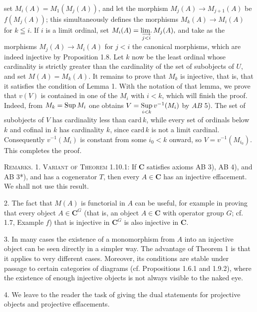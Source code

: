 
\noindent set $M_i(A)=M_1(M_j(A))$, and let the morphism
$M_j(A)\to M_{j+1}(A)$ be $f(M_j(A))$; this simultaneously
defines the morphisms $M_k(A)\to M_i(A)$ for $k\leqq i$. If $i$ is
a limit ordinal, set
$M_i(A)=\mathop{\rm lim.}\limits_{\substack{\longrightarrow\\j<i}}M_j(A),$ and take as the morphisms $M_j(A)\to M_i(A)$ for $j<i$
the canonical morphisms, which are indeed injective by Proposition 1.8. Let
$k$ now be the least ordinal whose cardinality is strictly greater than the
cardinality of the set of subobjects of $U$, and set $M(A)=M_k(A)$. It remains
to prove that $M_k$ is injective, that is, that it satisfies the condition of
Lemma 1. With the notation of that lemma, we prove that $v(V)$ is contained in
one of the $M_i$ with $i<k$, which will finish the proof. Indeed, from
$M_k=\mathop{\rm Sup}M_i$ one obtains
$V=\mathop{\rm Sup}\limits_{i<k}v^{-1}(M_i)$ by $AB$ 5). The set of subobjects of $V$ has cardinality less than
$\mathrm{card}\,k$, while every set of ordinals below $k$ and cofinal in $k$
has cardinality $k$, since $\mathrm{card}\,k$ is not a limit cardinal.
Consequently $v^{-1}(M_i)$ is constant from some $i_0<k$ onward, so
$V=v^{-1}(M_{i_0})$. This completes the proof.

\textsc{Remarks. 1. Variant of Theorem 1.10.1:} If $\mathbf{C}$ satisfies
axioms AB 3), AB 4), and AB 3*), and has a cogenerator $T$, then every
$A\in \mathbf{C}$ has an injective effacement. We shall not use this result.

 2. The fact that $M(A)$ is functorial in $A$ can be useful, for
example in proving that every object $A\in \mathbf{C}^G$ (that is, an object $A\in \mathbf{C}$
with operator group $G$; cf. 1.7, Example $f$) that is injective in $\mathbf{C}^G$ is
also injective in $\mathbf{C}$.

 3. In many cases the existence of a monomorphism from $A$ into an
injective object can be seen directly in a simpler way. The advantage of
Theorem 1 is that it applies to very different cases. Moreover, its conditions
are stable under passage to certain categories of diagrams (cf.
Propositions 1.6.1 and 1.9.2), where the existence of enough injective objects
is not always visible to the naked eye.

 4. We leave to the reader the task of giving the dual statements for
projective objects and projective effacements.

